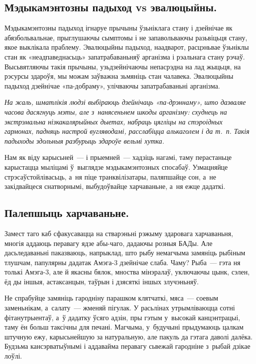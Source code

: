 
\subsection*{Мэдыкамэнтозны падыход vs эвалюцыйны.}

Мэдыкамэнтозны падыход ігнаруе прычыны ўзьніклага стану і дзейнічае як абязбольвальнае, прыглушаючы сымптомы і не запавольваючы разьвіцьця стану, якое выклікала праблему. Эвалюцыйны падыход, наадварот, расцэньвае ўзьніклы стан як «неадпаведнасьць» запатрабаваньняў арганізма і рэальнага стану рэчаў. Высьвятляючы такія прычыны, узьдзейнічаючы непасрэдна на лад жыцьця, на рэсурсы здароўя, мы можам заўважна зьмяніць стан чалавека. Эвалюцыйны падыход дзейнічае «па-добраму», улічваючы запатрабаваньні арганізма.

\emph{На жаль, шматлікія людзі выбіраюць дзейнічаць «па-дрэннаму», што дазваляе часова дасягнуць мэты, але з~нанясеньнем шкоды арганізму: схуднець на экстрэмальна нізкакалярыйных дыетах, набраць цягліцы на стэроідных гармонах, падняць настрой вугляводамі, расслабіцца алькаголем і да т.~п. Такія падыходы здольныя разбурыць здароўе вельмі хутка.}

Нам як віду карысьней~--- і прыемней~--- хадзіць нагамі, таму перастаньце карыстацца мыліцамі ў~выглядзе мэдыкамэнтозных спосабаў. Узмацняйце стрэсаўстойлівасьць, а~ня піце транквілізатары, паляпшайце сон, а~не закідвайцеся снатворнымі, выбудоўвайце харчаваньне, а~ня ежце дадаткі.

\subsection*{Палепшыць харчаваньне.}

Замест таго каб сфакусавацца на стварэньні рэжыму здаровага харчаваньня, многія аддаюць перавагу ядзе абы-чаго, дадаючы розныя БАДы. Але дасьледаваньні паказваюць, напрыклад, што рыбу немагчыма замяніць рыбіным тлушчам, папулярны дадатак Амэга-3 дзейнічае слаба. Чаму? Рыба~--- гэта ня толькі Амэга-3, але й якасны бялок, мноства мінэралаў, уключаючы цынк, сэлен, ёд ды іншыя, астаксанцын, таўрын і дзясяткі іншых злучэньняў.

Не спрабуйце замяніць гародніну парашком клятчаткі, мяса~--- соевым заменьнікам, а~салату~--- жменяй пігулак. У расьлінах утрымліваюцца сотні фітанутрыентаў, а~ў дадатку ўсяго адзін, пры гэтым у~высокай канцэнтрацыі, таму ён больш таксічны для печані. Магчыма, у~будучыні прыдумаюць цалкам штучную ежу, карысьнейшую за натуральную, але пакуль да гэтага даволі далёка. Будзьма кансэрватыўнымі і аддавайма перавагу сьвежай гародніне з~рыбай дзікае лоўлі.

